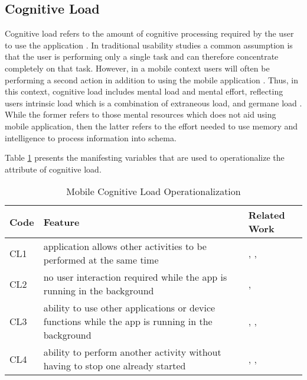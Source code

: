\documentclass[preprint,12pt]{elsarticle}
\begin{document}
\subsection{Cognitive Load}  %
Cognitive load refers to the amount of cognitive processing required by the user to use the application \cite{harrison2013usability}. 
In traditional usability studies a common assumption is that the user is performing only a single task and can therefore concentrate completely on that task. However, in a mobile context users will often be performing a second action in addition to using the mobile application \cite{deegan2015complex}. Thus, in this context, cognitive load includes mental load and mental effort, reflecting users intrinsic load which is a combination of extraneous load, and germane load \cite{sweller1998cognitive}. While the former refers to those mental resources which does not aid using mobile application, then the latter refers to the effort needed to use memory and intelligence to process information into schema.

Table \ref{tab:oper-cognitive-load} presents the manifesting variables that are used to operationalize the attribute of cognitive load. 

\begin{table}[h]
\caption{Mobile Cognitive Load Operationalization}
\label{tab:oper-cognitive-load}
\footnotesize
\begin{tabular}{|l|p{9cm}|p{2.5cm}|}
\hline
\textbf{Code}  & \textbf{Feature}  & \textbf{Related Work} \\ \hline
CL1 & application allows other activities to be performed at the same time & \cite{deegan2015complex}, \cite{weichbroth2020usability}, \cite{karczewska2021usability}   \\ \hline
CL2 & no user interaction required while the app is running in the background   & \cite{smith2017adaptive}, \cite{deegan2011usability}      \\ \hline
CL3 & ability to use other applications or device functions while the app is running in the background &   
\cite{harrison2013usability}, \cite{daud2023design}, \cite{deegan2014mobile}     \\ \hline
CL4 & ability to perform another activity without having to stop one already started  & \cite{harrison2013usability}, \cite{alasmari2020effect}, \cite{weichbroth2024usability}  \\ \hline
\end{tabular}
\end{table}
\end{document}
